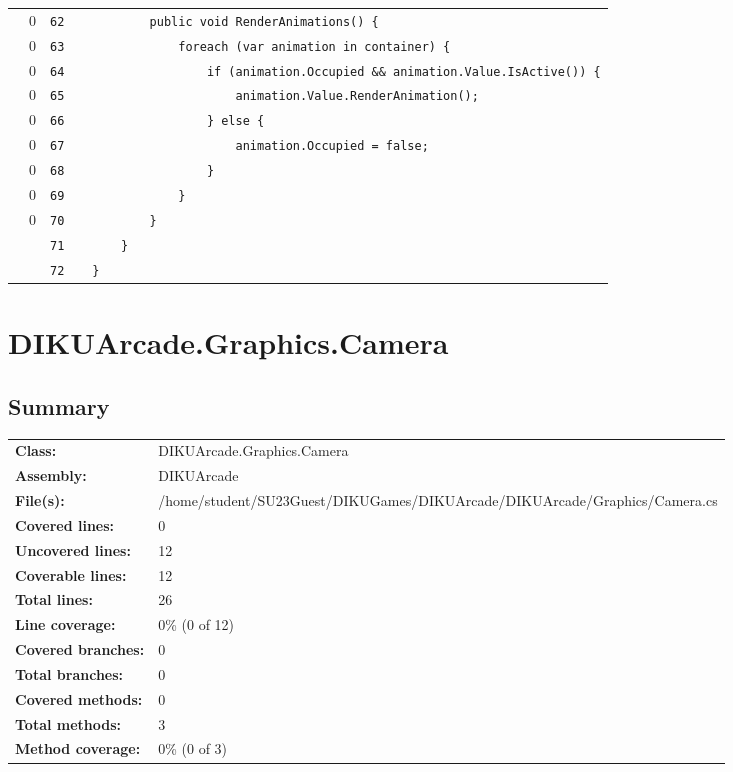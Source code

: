 \documentclass[a4paper,landscape,10pt]{article}
\begin{document}
\begin{longtable}[l]{lrrll}
\cellcolor{red} & 0 & \verb~62~ & & \verb~        public void RenderAnimations() {~\\
\cellcolor{red} & 0 & \verb~63~ & & \verb~            foreach (var animation in container) {~\\
\cellcolor{red} & 0 & \verb~64~ & & \verb~                if (animation.Occupied && animation.Value.IsActive()) {~\\
\cellcolor{red} & 0 & \verb~65~ & & \verb~                    animation.Value.RenderAnimation();~\\
\cellcolor{red} & 0 & \verb~66~ & & \verb~                } else {~\\
\cellcolor{red} & 0 & \verb~67~ & & \verb~                    animation.Occupied = false;~\\
\cellcolor{red} & 0 & \verb~68~ & & \verb~                }~\\
\cellcolor{red} & 0 & \verb~69~ & & \verb~            }~\\
\cellcolor{red} & 0 & \verb~70~ & & \verb~        }~\\
\cellcolor{gray} &  & \verb~71~ & & \verb~    }~\\
\cellcolor{gray} &  & \verb~72~ & & \verb~}~\\
\end{longtable}
\newpage
\section{DIKUArcade.Graphics.Camera}
\subsection{Summary}
\begin{longtable}[l]{ll}
\textbf{Class:} & DIKUArcade.Graphics.Camera\\
\textbf{Assembly:} & DIKUArcade\\
\textbf{File(s):} & \begin{minipage}[t]{12cm}{/home/student/SU23Guest/DIKUGames/DIKUArcade/DIKUArcade/Graphics/Camera.cs}\end{minipage} \\
\textbf{Covered lines:} & 0\\
\textbf{Uncovered lines:} & 12\\
\textbf{Coverable lines:} & 12\\
\textbf{Total lines:} & 26\\
\textbf{Line coverage:} & 0\% (0 of 12)\\
\textbf{Covered branches:} & 0\\
\textbf{Total branches:} & 0\\
\textbf{Covered methods:} & 0\\
\textbf{Total methods:} & 3\\
\textbf{Method coverage:} & 0\% (0 of 3)\\
\end{longtable}
\end{document}
